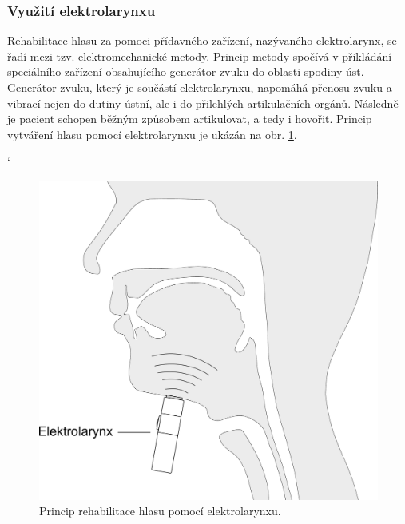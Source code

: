 
\subsubsection{Využití elektrolarynxu} %
\label{chap:cause:treatment:foniatric:elektrolarynx}

Rehabilitace hlasu za pomoci přídavného zařízení, nazývaného elektrolarynx, se řadí mezi tzv. elektromechanické
metody. Princip metody spočívá v přikládání speciálního zařízení obsahujícího generátor zvuku do oblasti spodiny úst. Generátor zvuku, který je součástí elektrolarynxu, napomáhá přenosu zvuku a vibrací nejen do dutiny ústní, ale i do přilehlých artikulačních orgánů. Následně je pacient schopen běžným způsobem artikulovat, a tedy i hovořit. Princip vytváření hlasu pomocí elektrolarynxu je ukázán na obr. \ref{fig:cause:treatment:electrolarynx}.



`%

\begin{figure}[htb]
  \begin{center}
    \includegraphics[width=0.6\linewidth]{ch3-cause/figures/electrolarynx}
    \caption[Princip rehabilitace hlasu pomocí elektrolarynxu.]{Princip rehabilitace hlasu pomocí elektrolarynxu.}
    \label{fig:cause:treatment:electrolarynx}
  \end{center}
\end{figure}

